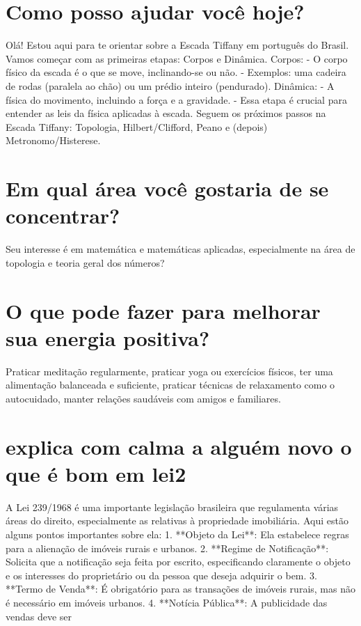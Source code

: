 \documentclass[11pt,a4paper]{article}
\begin{document}
\section{Como posso ajudar você hoje?}
Olá! Estou aqui para te orientar sobre a Escada Tiffany em português do Brasil. Vamos começar com as primeiras etapas: Corpos e Dinâmica. Corpos: - O corpo físico da escada é o que se move, inclinando-se ou não. - Exemplos: uma cadeira de rodas (paralela ao chão) ou um prédio inteiro (pendurado). Dinâmica: - A física do movimento, incluindo a força e a gravidade. - Essa etapa é crucial para entender as leis da física aplicadas à escada. Seguem os próximos passos na Escada Tiffany: Topologia, Hilbert/Clifford, Peano e (depois) Metronomo/Histerese.

\section{Em qual área você gostaria de se concentrar?}
Seu interesse é em matemática e matemáticas aplicadas, especialmente na área de topologia e teoria geral dos números?

\section{O que pode fazer para melhorar sua energia positiva?}
Praticar meditação regularmente, praticar yoga ou exercícios físicos, ter uma alimentação balanceada e suficiente, praticar técnicas de relaxamento como o autocuidado, manter relações saudáveis com amigos e familiares.

\section{explica com calma a alguém novo o que é bom em lei2}
A Lei 239/1968 é uma importante legislação brasileira que regulamenta várias áreas do direito, especialmente as relativas à propriedade imobiliária. Aqui estão alguns pontos importantes sobre ela: 1. **Objeto da Lei**: Ela estabelece regras para a alienação de imóveis rurais e urbanos. 2. **Regime de Notificação**: Solicita que a notificação seja feita por escrito, especificando claramente o objeto e os interesses do proprietário ou da pessoa que deseja adquirir o bem. 3. **Termo de Venda**: É obrigatório para as transações de imóveis rurais, mas não é necessário em imóveis urbanos. 4. **Notícia Pública**: A publicidade das vendas deve ser
\end{document}
